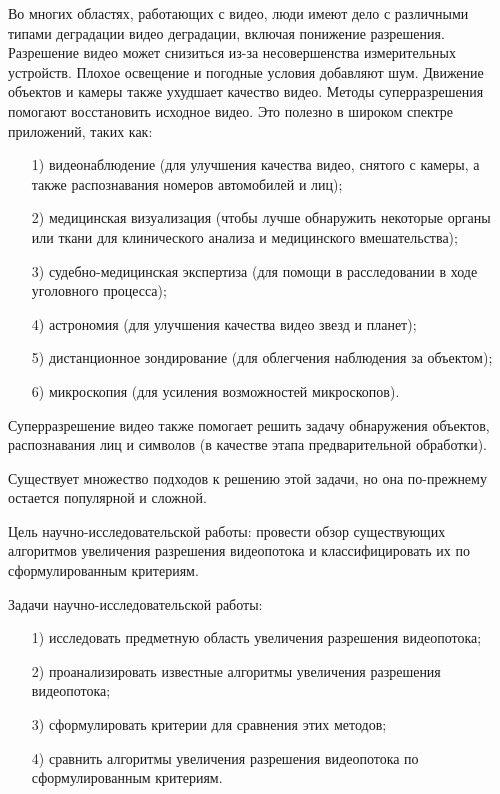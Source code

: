 \documentclass{bmstu}
\begin{document}
Во многих областях, работающих с видео, люди имеют дело с различными типами деградации видео деградации, включая понижение разрешения. 
Разрешение видео может снизиться из-за несовершенства измерительных устройств. 
Плохое освещение и погодные условия добавляют шум. 
Движение объектов и камеры также ухудшает качество видео. 
Методы суперразрешения помогают восстановить исходное видео. 
Это полезно в широком спектре приложений, таких как:
\begin{enumerate}
\item[1)] видеонаблюдение (для улучшения качества видео, снятого с камеры, а также распознавания номеров автомобилей и лиц);
\item[2)] медицинская визуализация (чтобы лучше обнаружить некоторые органы или ткани для клинического анализа и медицинского вмешательства);
\item[3)] судебно-медицинская экспертиза (для помощи в расследовании в ходе уголовного процесса);
\item[4)] астрономия (для улучшения качества видео звезд и планет);
\item[5)] дистанционное зондирование (для облегчения наблюдения за объектом);
\item[6)] микроскопия (для усиления возможностей микроскопов).
\end{enumerate}

Суперразрешение видео также помогает решить задачу обнаружения объектов, распознавания лиц и символов (в качестве этапа предварительной обработки).

Существует множество подходов к решению этой задачи, но она по-прежнему остается популярной и сложной.

Цель научно-исследовательской работы: провести обзор существующих алгоритмов увеличения разрешения видеопотока и классифицировать их по сформулированным критериям.

Задачи научно-исследовательской работы:
\begin{enumerate}
\item[1)] исследовать предметную область увеличения разрешения видеопотока;
\item[2)] проанализировать известные алгоритмы увеличения разрешения видеопотока;
\item[3)] сформулировать критерии для сравнения этих методов;
\item[4)] сравнить алгоритмы увеличения разрешения видеопотока по сформулированным критериям.
\end{enumerate}
\end{document}
